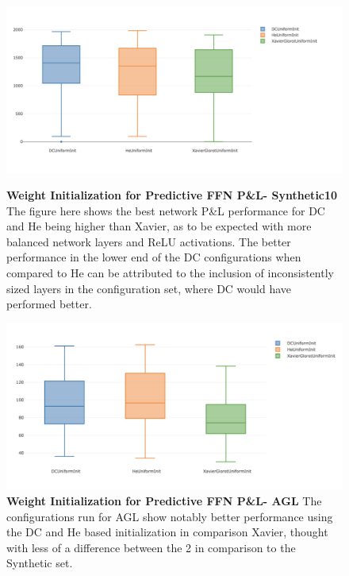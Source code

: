 \documentclass[a4paper,latin]{paper}
\begin{document}
\begin{figure}[H]
	\centering
	\begin{minipage}{0.45\textwidth}
		\centering 
		\includegraphics[scale=0.3]{images/iteration_five/init4_ffn_init.png}
		\caption{\textbf{Weight Initialization for Predictive FFN P\&L- Synthetic10}
			\newline The figure here shows the best network P\&L performance for DC and He being higher than Xavier, as to be expected with more balanced network layers and ReLU activations. The better performance in the lower end of the DC configurations when compared to He can be attributed to the inclusion of inconsistently sized layers in the configuration set, where DC would have performed better.}
		\label{figure-init4_ffn_init}
	\end{minipage}\hfill
	\begin{minipage}{0.45\textwidth}
		\centering \includegraphics[scale=0.3]{images/iteration_five/init5_ffn_init.png}
		\caption{\textbf{Weight Initialization for Predictive FFN P\&L- AGL} 
			\newline The configurations run for AGL show notably better performance using the DC and He based initialization in comparison Xavier, thought with less of a difference between the 2 in comparison to the Synthetic set.}
		\label{figure-init5_ffn_init}
	\end{minipage}
\end{figure}
\end{document}
